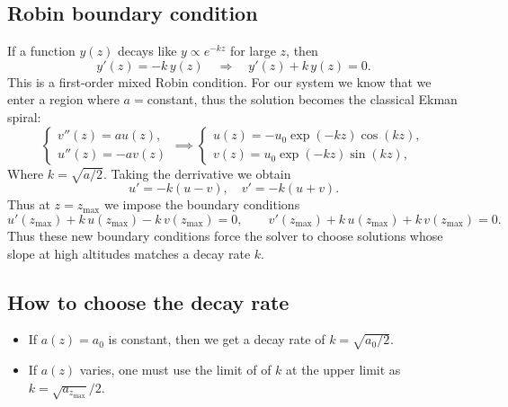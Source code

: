 \subsection{Robin boundary condition}
If a function \(y(z)\) decays like \(y\!\propto\!e^{-k z}\) for large \(z\), then
\[
y'(z) = -k\,y(z) \quad \Longrightarrow \quad y'(z)+k\,y(z)=0.
\]
This is a first-order mixed Robin condition. For our system we know that we enter a region where $a=$constant, thus the solution becomes the classical Ekman spiral:
\begin{equation}
    \begin{cases}
        v''(z) = a u(z), \\
        u''(z) = -a v(z)
    \end{cases} \implies
    \begin{cases}
        u(z) = -u_0\exp(-k z)\cos(k z), \\
        v(z) = u_0\exp(-k z)\sin(k z),
    \end{cases}
\end{equation}
Where \(k=\sqrt{a/2}\). Taking the derrivative we obtain 
\begin{equation*}
    u'=-k(u-v),\quad
    v'= -k(u+v).
\end{equation*}
Thus at \(z=z_{\max}\) we impose the boundary conditions
\[
u'(z_{\max}) + k\,u(z_{\max}) - k\,v(z_{\max}) = 0,\qquad
v'(z_{\max}) + k\,u(z_{\max}) + k\,v(z_{\max}) = 0.
\]
Thus these new boundary conditions force the solver to choose solutions whose slope at high altitudes matches a decay rate \(k\). 

\subsection{How to choose the decay rate}
\begin{itemize}
  \item If \(a(z)=a_0\) is constant, then we get a  decay rate of \(k=\sqrt{a_0/2}\).
  \item If \(a(z)\) varies, one must use the limit of 
  of $k$ at the upper limit as $ k= \sqrt{a_{z_\text{max}}}/2$.
\end{itemize}


